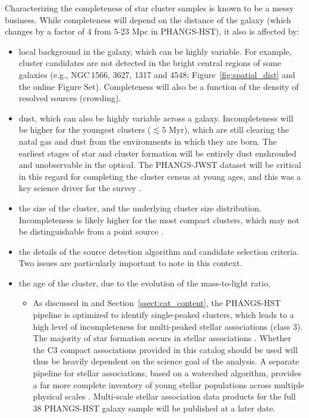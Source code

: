 \documentclass[linenumbers]{aastex63}
\begin{document}
Characterizing the completeness of star cluster samples is known to be a messy business. While completeness will depend on the distance of the galaxy (which changes by a factor of 4 from 5-23 Mpc in PHANGS-HST), it also is affected by:
\begin{itemize}
    \item local background in the galaxy, which can be highly variable.  For example, cluster candidates are not detected in the bright central regions of some galaxies (e.g., NGC\,1566, 3627, 1317 and 4548; Figure~\ref{fig:spatial_dist} and the online Figure Set). Completeness will also be a function of the density of resolved sources (crowding).
    \item dust, which can also be highly variable across a galaxy.  Incompleteness will be higher for the youngest clusters ($\lesssim5$ Myr), which are still clearing the natal gas and dust from the environments in which they are born.  The earliest stages of star and cluster formation will be entirely dust enshrouded and unobservable in the optical.   The PHANGS-JWST dataset will be critical in this regard for completing the cluster census at young ages, and this was a key science driver for the survey \citep[][and references therein]{lee_phangs-jwst_2023}.
    \item the size of the cluster, and the underlying cluster size distribution.  Incompleteness is likely higher for the most compact clusters, which may not be distinguishable from a point source \citep[e.g.,][]{ryon_effective_2017, brown_radii_2021}.  
    \item the details of the source detection algorithm and candidate selection criteria.  Two issues are particularly important to note in this context.
    \item the age of the cluster, due to the evolution of the mass-to-light ratio,
    \begin{itemize}
    \item As discussed in \citet{lee_phangs-hst_2022} and Section~\ref{ssect:cat_content}, the PHANGS-HST pipeline is optimized to identify single-peaked clusters, which leads to a high level of incompleteness for multi-peaked stellar associations (class 3).  The majority of star formation occurs in stellar associations \citep[][and references therein]{lada03,ward18, ward20, wright20}.  Whether the C3 compact associations provided in this catalog should be used will thus be heavily dependent on the science goal of the analysis. A separate pipeline for stellar associations, based on a watershed algorithm, provides a far more complete inventory of young stellar populations across multiple physical scales \citep{larson_multiscale_2023}. Multi-scale stellar association data products for the full 38 PHANGS-HST galaxy sample will be published at a later date.  

\end{itemize}
\end{itemize}
\end{document}
